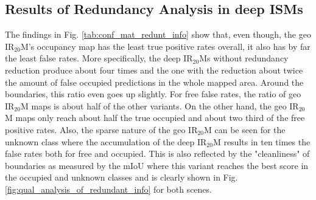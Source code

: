 \subsection{Results of Redundancy Analysis in deep ISMs}
\label{subsec:results_of_red_analy}
The findings in Fig. \ref{tab:conf_mat_redunt_info} show that, even though, the geo IR$_{20}$M's occupancy map has the least true positive rates overall, it also has by far the least false rates. More specifically, the deep IR$_{20}$Ms without redundancy reduction produce about four times and the one with the reduction about twice the amount of false occupied predictions in the whole mapped area. Around the boundaries, this ratio even goes up slightly. For free false rates, the ratio of geo IR$_{20}$M maps is about half of the other variants. On the other hand, the geo IR$_{20}$M maps only reach about half the true occupied and about two third of the free positive rates. Also, the sparse nature of the geo IR$_{20}$M can be seen for the unknown class where the accumulation of the deep IR$_{20}$M results in ten times the false rates both for free and occupied. This is also reflected by the "cleanliness" of boundaries as measured by the mIoU where this variant reaches the best score in the occupied and unknown classes and is clearly shown in Fig. \ref{fig:qual_analysis_of_redundant_info} for both scenes.
